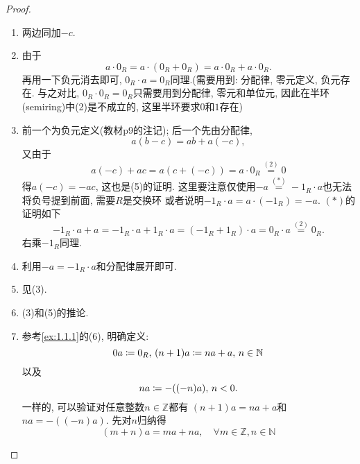 \begin{proof}
    \begin{enumerate}[(1)]
        \item 两边同加$-c$.
        \item 由于
        \[
            a \cdot 0_R = a \cdot (0_R + 0_R) = a \cdot 0_R + a \cdot 0_R.
        \]
        再用一下负元消去即可, $0_R \cdot a = 0_R$同理.(需要用到: 分配律, 零元定义, 
    负元存在. 与之对比, $0_R \cdot 0_R = 0_R$只需要用到分配律, 零元和单位元, 
    因此在半环(semiring)中(2)是不成立的, 这里半环要求$0$和$1$存在)
        \item 前一个为负元定义(教材p9的注记); 后一个先由分配律, 
    \[
        a(b - c) = ab + a(-c),
    \]
    又由于
    \[
        a(-c) + ac = a(c + (-c)) = a \cdot 0_R \overset{(2)}= 0
    \]
    得$a(-c) = -ac$, 这也是(5)的证明.
    这里要注意仅使用$-a \overset{(*)}= -1_R \cdot a$也无法将负号提到前面, 需要$R$是交换环
    或者说明$-1_R \cdot a = a \cdot (-1_R) = -a$.
    $(*)$的证明如下
    \[
        -1_R \cdot a + a = -1_R \cdot a + 1_R \cdot a = (-1_R + 1_R) \cdot a = 0_R \cdot a \overset{(2)}= 0_R.
    \]
    右乘$-1_R$同理.
        \item 利用$-a = -1_R \cdot a$和分配律展开即可.
        \item 见(3).
        \item (3)和(5)的推论.
        \item 参考\ref{ex:1.1.1}的(6), 明确定义: 
        \[
            0a \mathrel{\coloneqq} 0_R,\, (n + 1)a \mathrel{\coloneqq} na + a,\, n \in \mathbb{N}
        \]
        以及
        \[
            na \mathrel{\coloneqq} -((-n)a),\, n < 0.
        \]
        一样的, 可以验证对任意整数$n \in \mathbb{Z}$都有
        $(n + 1)a = na + a$和$na = -((-n)a)$.
        先对$n$归纳得
    \begin{equation}
        (m + n)a = ma + na, \quad \forall m \in \mathbb{Z}, n \in \mathbb{N}
        \tag{i}
        \label{eq:1.2.1.7}
    \end{equation}
        

\end{enumerate}
\end{proof}
